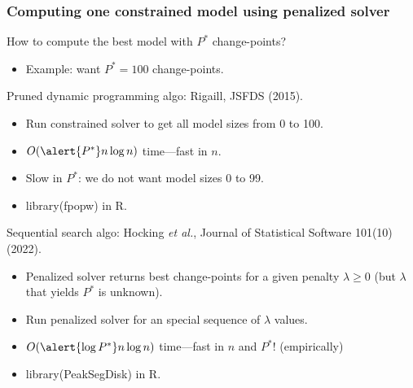 \documentclass{beamer}
\begin{document}
\begin{frame}
  \frametitle{Computing one constrained model using penalized solver}

  How to compute the best model with $P^*$ change-points? 

  \begin{itemize}
  \item Example: want $P^*=100$ change-points.
  \end{itemize}

  Pruned dynamic programming algo: Rigaill, JSFDS (2015).
  \begin{itemize}
  \item Run \alert{constrained} solver to get all model sizes from 0 to 100.
  \item $O(\alert{P^*} n\log n)$ time---fast in $n$.
  \item Slow in $P^*$: we do not want model sizes 0 to 99.
  \item library(fpopw) in R.
  \end{itemize}

  Sequential search algo: Hocking \emph{et al.}, Journal of Statistical Software 101(10) (2022).
  \begin{itemize}
  \item Penalized solver returns best change-points for a given
    penalty $\lambda\geq 0$ (but $\lambda$ that yields $P^*$ is
    unknown).
  \item Run \alert{penalized} solver for an special sequence of $\lambda$ values.
  \item $O(\alert{\log P^*} n\log n)$ time---fast in $n$ and $P^*$! (empirically)
  \item library(PeakSegDisk) in R.
  \end{itemize}
\end{frame}
 
\end{document}
